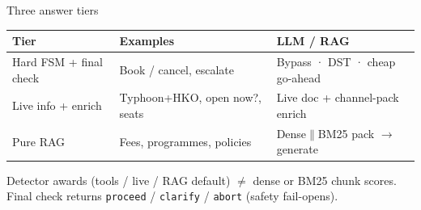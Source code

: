 \documentclass{beamer}
\begin{document}
\begin{frame}{Three answer tiers}{\thesection}
  \renewcommand{\arraystretch}{1.32}
  {\small
  \begin{tabular}{@{}p{}p{}p{}@{}}
    \toprule
    \textbf{Tier} & \textbf{Examples} & \textbf{LLM / RAG} \\
    \midrule
    Hard FSM + final check & Book / cancel, escalate & Bypass · DST · cheap go-ahead \\
    Live info + enrich & Typhoon+HKO, open now?, seats & Live doc + channel-pack enrich \\
    Pure RAG & Fees, programmes, policies & Dense$\parallel$BM25 pack $\rightarrow$ generate \\
    \bottomrule
  \end{tabular}}
  \vspace{0.55em}
  {\raggedright\small
  Detector awards (tools / live / RAG default) $\neq$ dense or BM25 chunk scores.\\
  Final check returns \texttt{proceed} / \texttt{clarify} / \texttt{abort} (safety fail-opens).}
\end{frame}
\end{document}
